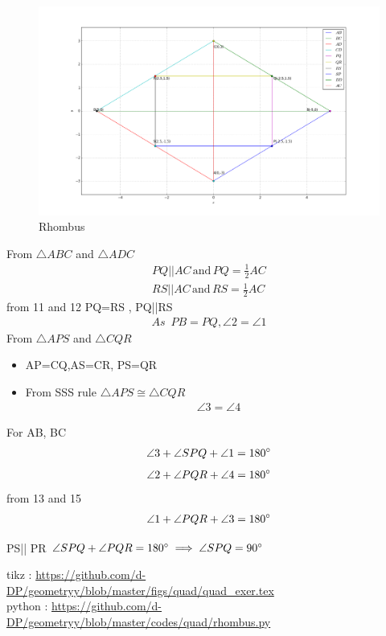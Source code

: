 \begin{frame}
\begin{figure}[!h]
\resizebox{0.3\linewidth}{!}
{
\includegraphics[scale=1.2]{./figs/quad/rhomb.png}

}
\caption{Rhombus}
\label{fig:foo}
\end{figure}
From $\triangle{ABC}$ and $\triangle{ADC}$
\begin{align}
PQ || AC \hspace{2pt}\text{and}\hspace{2pt} PQ=\frac{1}{2}AC\\
RS || AC \hspace{2pt}\text{and}\hspace{2pt} RS=\frac{1}{2}AC
\end{align}
from 11 and 12 PQ=RS , PQ||RS 
\begin{align}
 \textit{As}\hspace{6pt} PB=PQ, \angle{2} =\angle{1}
\end{align}
From $\triangle{APS}$ and $\triangle{CQR}$ \\
\begin{itemize}
\item AP=CQ,AS=CR, PS=QR\\
\item From SSS rule
$\triangle{APS} \cong \triangle{CQR}$
\begin{align}
\angle{3} = \angle{4}
\end{align}
\end{itemize}
\end{frame}
\begin{frame}
For AB, BC
\begin{align}
\angle{3}+\angle{SPQ}+\angle{1} = 180\degree
\end{align}
\begin{align*}
\angle{2}+\angle{PQR}+\angle{4}=180\degree
\end{align*}
from 13 and 15 
\begin{align}
\angle{1}+\angle{PQR}+\angle{3}=180\degree
\end{align}
\begin{center}
PS|| PR $\angle{SPQ}+\angle{PQR} =180\degree \implies \angle{SPQ}=90\degree$
\end{center}
tikz : \url{https://github.com/d-DP/geometryy/blob/master/figs/quad/quad_exer.tex}\\
python : \url{https://github.com/d-DP/geometryy/blob/master/codes/quad/rhombus.py}
\end{frame}